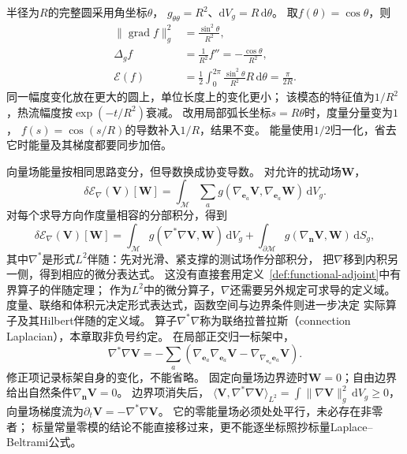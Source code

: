 \begin{example}
\label{ex:geometry-circle-energy-scale}
半径为$R$的完整圆采用角坐标$\theta$，
$g_{\theta\theta}=R^2$、$\mathrm dV_g=R\,\mathrm d\theta$。
取$f(\theta)=\cos\theta$，则
\[
 \begin{aligned}
 \lVert\operatorname{grad}f\rVert_g^2&=\frac{\sin^2\theta}{R^2},\\
 \Delta_gf&=\frac1{R^2}f''=-\frac{\cos\theta}{R^2},\\
 \mathcal E(f)&=\frac12\int_0^{2\pi}
        \frac{\sin^2\theta}{R^2}R\,\mathrm d\theta=\frac{\pi}{2R}.
 \end{aligned}
\]
同一幅度变化放在更大的圆上，单位长度上的变化更小；
该模态的特征值为$1/R^2$，热流幅度按$\exp(-t/R^2)$衰减。
改用局部弧长坐标$s=R\theta$时，度量分量变为$1$，
$f(s)=\cos(s/R)$的导数补入$1/R$，结果不变。
能量使用$1/2$归一化，省去它时能量及其梯度都要同步加倍。
\end{example}

向量场能量按相同思路变分，但导数换成协变导数。
对允许的扰动场$\bm W$，
\[
 \delta\mathcal E_\nabla(\bm V)[\bm W]
 =\int_{\mathcal M}\sum_a
     g(\nabla_{\bm e_a}\bm V,\nabla_{\bm e_a}\bm W)\,\mathrm dV_g.
\]
对每个求导方向作度量相容的分部积分，得到
\begin{equation}
 \delta\mathcal E_\nabla(\bm V)[\bm W]
 =\int_{\mathcal M}g(\nabla^*\nabla\bm V,\bm W)\,\mathrm dV_g
  +\int_{\partial\mathcal M}g(\nabla_{\bm n}\bm V,\bm W)\,\mathrm dS_g,
 \label{eq:geometry-connection-laplacian-variation}
\end{equation}
其中$\nabla^*$是形式$L^2$伴随：先对光滑、紧支撑的测试场作分部积分，
把$\nabla$移到内积另一侧，得到相应的微分表达式。
这没有直接套用定义~\ref{def:functional-adjoint}中有界算子的伴随定理；
作为$L^2$中的微分算子，$\nabla$还需要另外规定可求导的定义域。
度量、联络和体积元决定形式表达式，函数空间与边界条件则进一步决定
实际算子及其Hilbert伴随的定义域。
算子$\nabla^*\nabla$称为联络拉普拉斯（connection Laplacian），本章取非负号约定。
在局部正交归一标架中，
\[
 \nabla^*\nabla\bm V
 =-\sum_a\left(\nabla_{\bm e_a}\nabla_{\bm e_a}\bm V
                 -\nabla_{\nabla_{\bm e_a}\bm e_a}\bm V\right).
\]
修正项记录标架自身的变化，不能省略。
固定向量场边界迹时$\bm W=0$；自由边界给出自然条件$\nabla_{\bm n}\bm V=0$。
边界项消失后，
$\langle\bm V,\nabla^*\nabla\bm V\rangle_{L^2}
=\int\lVert\nabla\bm V\rVert_g^2\,\mathrm dV_g\geq0$，
向量场梯度流为$\partial_t\bm V=-\nabla^*\nabla\bm V$。
它的零能量场必须处处平行，未必存在非零者；
标量常量零模的结论不能直接移过来，更不能逐坐标照抄标量Laplace--Beltrami公式。

